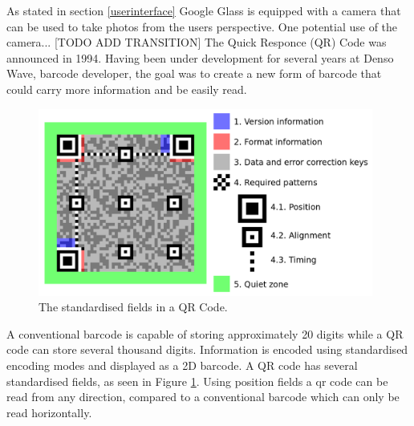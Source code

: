 As stated in section \ref{userinterface} Google Glass is equipped with a camera that can be used to take photos from the users perspective. One potential use of the camera... [TODO ADD TRANSITION] The Quick Responce (QR) Code was announced in 1994. Having been under development for several years at Denso Wave, barcode developer, the goal was to create a new form of barcode that could carry more information and be easily read.\cite{qrCodeHistory}

	\begin{figure}[ht!]
		\centering
		\includegraphics[width=110mm]{images/qrcodestandard}
		\caption{The standardised fields in a QR Code.\cite{qrCodeWiki}}
		\label{qrcodestandard}
	\end{figure}
	
A conventional barcode is capable of storing approximately 20 digits while a QR code can store several thousand digits.\cite{qrCodeType} Information is encoded using standardised encoding modes and displayed as a 2D barcode. A QR code has several standardised fields, as seen in Figure \ref{qrcodestandard}. Using position fields a qr code can be read from any direction, compared to a conventional barcode which can only be read horizontally.\cite{qrCodeAbout}
